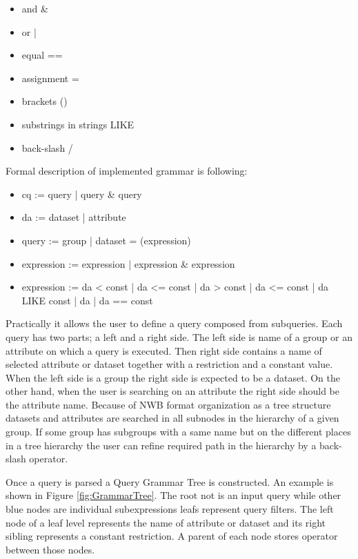 \documentclass[utf8]{frontiersSCNS} %
\begin{document}
\begin{itemize}
 \item and \&
 \item or  |
 \item equal ==
 \item assignment =
 \item brackets ()
 \item substrings in strings LIKE
 \item back-slash /
\end{itemize}

Formal description of implemented grammar is following:

\begin{itemize}
\item cq := query | query \& query
\item da := dataset | attribute
\item query := group | dataset = (expression)
\item expression := expression | expression \& expression
\item expression := da < const | da <= const | da > const | da <= const | da LIKE const | da | da == const 
\end{itemize}

Practically it allows the user to define a query composed from subqueries. Each query has two parts; a left and a right side. The left side is name of a group or an attribute on which a query is executed. Then right side contains a name of selected attribute or dataset together with a restriction and a constant value. When the left side is a group the right side is  expected to be a dataset. On the other hand, when the user is searching on an attribute the right side should be the attribute name. Because of NWB format organization as a tree structure datasets and attributes are searched in all subnodes in the hierarchy of a given group. If some group has subgroups with a same name but on the different places in a tree hierarchy the user can refine required path in the hierarchy by a back-slash operator.

Once a query is parsed a Query Grammar Tree is constructed. An example is shown in Figure \ref{fig:GrammarTree}. The root not is an input query while other blue nodes are individual subexpressions leafs represent query filters. The left node of a leaf level represents the name of attribute or dataset and its right sibling represents a constant restriction. A parent of each node stores operator between those nodes.
\end{document}
